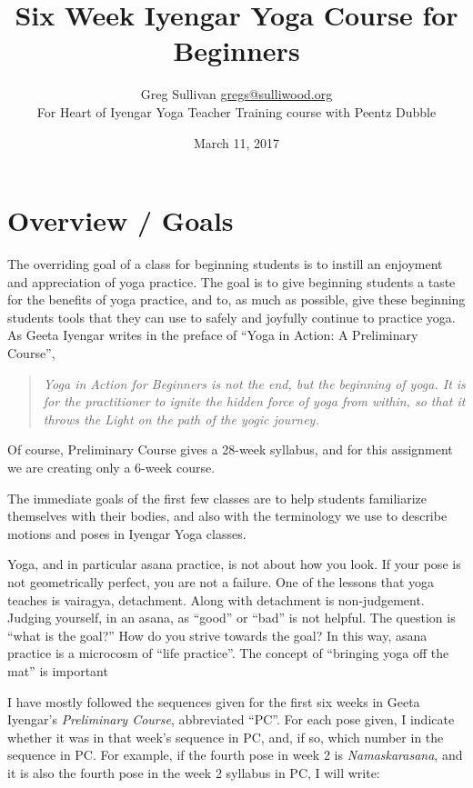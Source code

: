 \documentclass{book}
\title{Six Week Iyengar Yoga Course for Beginners}
\author{Greg Sullivan \href{mailto:gregs@sulliwood.org}{gregs@sulliwood.org} \\
For Heart of Iyengar Yoga Teacher Training course with Peentz Dubble
}
\date{March 11, 2017}
\newcommand{\apose}[1]{\emph{#1}}
\newcommand{\nam}{\apose{Namaskarasana}}
\newcounter{week}
\newcounter{pose}
\begin{document}
\maketitle

\tableofcontents

\chapter*{Overview / Goals}
\label{chap:overview}


The overriding goal of a class for beginning students is to instill an
enjoyment and appreciation of yoga practice. The goal is to give
beginning students a taste for the benefits of yoga practice, and to,
as much as possible, give these beginning students tools that they can
use to safely and joyfully continue to practice yoga. As Geeta Iyengar
writes in the preface of ``Yoga in Action: A Preliminary
Course''\cite{GeetaPC}, 

\begin{quote}
  \emph{Yoga in Action for Beginners is not the end, but the beginning of
  yoga. It is for the practitioner to ignite the hidden force of yoga
  from within, so that it throws the Light on the path of the yogic
  journey.}
\end{quote}

Of course, Preliminary Course gives a 28-week syllabus, and for this
assignment we are creating only a 6-week course.

The immediate goals of the first few classes are to help students
familiarize themselves with their bodies, and also with the
terminology we use to describe motions and poses in Iyengar Yoga
classes.

Yoga, and in particular asana practice, is not about how you look. If
your pose is not geometrically perfect, you are not a failure. One of
the lessons that yoga teaches is vairagya, detachment. Along with
detachment is non-judgement. Judging yourself, in an asana, as ``good''
or ``bad'' is not helpful. The question is ``what is the goal?'' How do
you strive towards the goal? In this way, asana practice is a
microcosm of ``life practice''. The concept of ``bringing yoga off the
mat'' is important


I have mostly followed the sequences given for the first six weeks in
Geeta Iyengar's \emph{Preliminary Course}\cite{GeetaPC}, abbreviated
``PC''. For each pose given, I indicate whether it was in that week's
sequence in PC, and, if so, which number in the sequence in PC.
For example, if the fourth pose in week 2 is \nam{}, and it is also
the fourth pose in the week 2 syllabus in PC, I will write:
\end{document}
